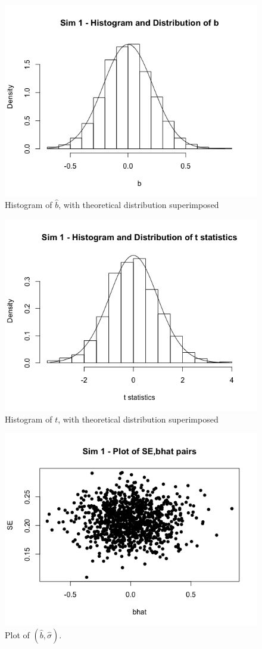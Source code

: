 \documentclass{amsart}
\begin{document}
		\begin{figure}[b]
			\includegraphics[width = 0.75\linewidth]{bhist}
			\caption{Histogram of $\hat{b}$, with theoretical distribution superimposed}
			\label{bhist}
		\end{figure}

		\begin{figure}[t]
			\includegraphics[width = 0.75\linewidth]{tstathist}
			\caption{Histogram of $t$, with theoretical distribution superimposed}
			\label{tstathist}
		\end{figure}

		\begin{figure}[b]
			\includegraphics[width = 0.75\linewidth]{scatterplot2}
			\caption{Plot of $\left( \hat{b}, \hat{\sigma} \right)$.}
			\label{scatterplot2}
		\end{figure}
\end{document}

